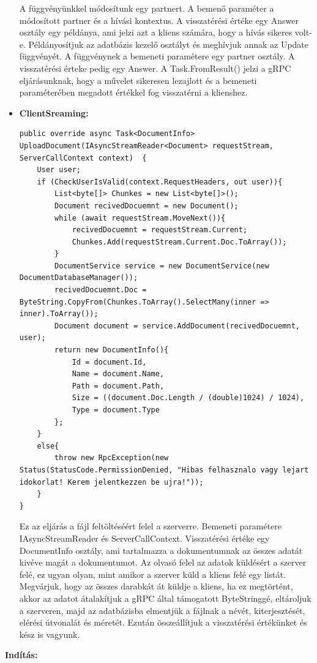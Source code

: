 \documentclass[
]{thesis-ekf}
\theoremstyle{definition}
\theoremstyle{remark}
\begin{document}
\begin{itemize}[leftmargin=0pt]
\begin{lstlisting}[showstringspaces=false,caption={Partner módosítása.},captionpos=b]
	\end{lstlisting}
	A függvényünkkel módosítunk egy partnert. A bemenő paraméter a módosított partner és a hívási kontextus. A visszatérési értéke egy Answer osztály egy példánya, ami jelzi azt a kliens számára, hogy a hívás sikeres volt-e. Példányosítjuk az adatbázis kezelő osztályt és meghívjuk annak az Update függvényét. A függvénynek a bemeneti paramétere egy partner osztály. A visszatérési érteke pedig egy Answer. A Task.FromResult() jelzi a gRPC eljárásunknak, hogy a művelet sikeresen lezajlott és a bemeneti paraméterében megadott értékkel fog visszatérni a klienshez.
	\item \textbf{ClientSreaming: }
			\begin{lstlisting}[showstringspaces=false,caption={ Dokumentum feltöltésnek a szerver oldala.},captionpos=b]
public override async Task<DocumentInfo> UploadDocument(IAsyncStreamReader<Document> requestStream, ServerCallContext context)  {
	User user;
    if (CheckUserIsValid(context.RequestHeaders, out user)){
		List<byte[]> Chunkes = new List<byte[]>();
		Document recivedDocuemnt = new Document();
		while (await requestStream.MoveNext()){
			recivedDocuemnt = requestStream.Current;
			Chunkes.Add(requestStream.Current.Doc.ToArray());
		}
		DocumentService service = new DocumentService(new DocumentDatabaseManager());
		recivedDocuemnt.Doc = ByteString.CopyFrom(Chunkes.ToArray().SelectMany(inner => inner).ToArray());
		Document document = service.AddDocument(recivedDocuemnt, user);
		return new DocumentInfo(){
			Id = document.Id,
			Name = document.Name,
			Path = document.Path,
			Size = ((document.Doc.Length / (double)1024) / 1024),
			Type = document.Type
		};
	}
	else{
		throw new RpcException(new Status(StatusCode.PermissionDenied, "Hibas felhasznalo vagy lejart idokorlat! Kerem jelentkezzen be ujra!"));
	}
}
	\end{lstlisting}
	Ez az eljárás a fájl feltöltéséért felel a szerverre. Bemeneti paramétere IAsyncStreamReader és ServerCallContext. Visszatérési értéke egy DocumentInfo osztály, ami tartalmazza a dokumentumnak az összes adatát kivéve magát a dokumentumot. Az olvasó felel az adatok küldésért a szerver felé, ez ugyan olyan, mint amikor a szerver küld a kliens felé egy listát. Megvárjuk, hogy az összes darabkát át küldje a kliens, ha ez megtörtént, akkor az adatot átalakítjuk a gRPC által támogatott ByteStringgé, eltároljuk a szerveren, majd az adatbázisba elmentjük a fájlnak a névét, kiterjesztését, elérési útvonalát és méretét. Ezután összeállítjuk a visszatérési értékünket és kész is vagyunk.
\end{itemize}
\textbf{Indítás: }
\end{document}
